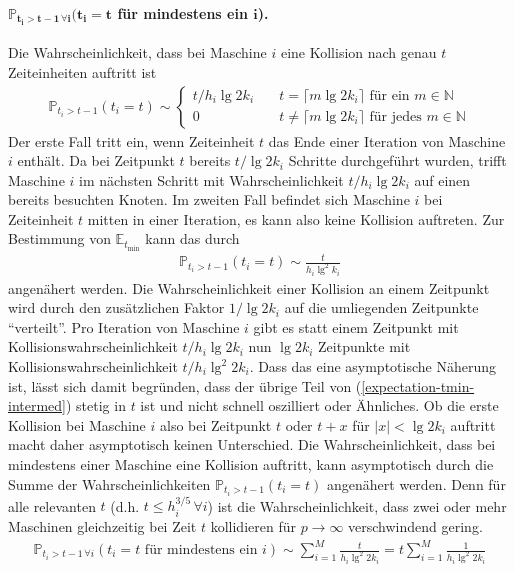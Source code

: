 \documentclass[a4paper, 10pt, ngerman]{article}
\newcommand{\E}{\mathbb{E}}
\newcommand{\N}{\mathbb{N}}
\renewcommand{\P}{\mathbb{P}}
\begin{document}
\paragraph{$\bm{\P_{t_i > t - 1 \, \forall i}(t_i = t}$  für mindestens ein $\bm{i}$).} Die Wahrscheinlichkeit, dass bei Maschine $i$ eine Kollision nach genau $t$ Zeiteinheiten auftritt ist
    \begin{align*}
        \P_{t_i > t - 1}(t_i = t) \sim
        \begin{cases}
            t / h_i \lg 2k_i & \quad
            t = \lceil m \lg 2k_i \rceil \text{ für ein } m \in \N \\
            0                & \quad
            t \ne \lceil m \lg 2k_i \rceil \text{ für jedes } m \in \N
        \end{cases}
    \end{align*}
    Der erste Fall tritt ein, wenn Zeiteinheit $t$ das Ende einer Iteration von Maschine $i$ enthält. Da bei Zeitpunkt $t$ bereits $t/\lg 2k_i$ Schritte durchgeführt wurden, trifft Maschine $i$ im nächsten Schritt mit Wahrscheinlichkeit $t/h_i \lg 2k_i$ auf einen bereits besuchten Knoten. Im zweiten Fall befindet sich Maschine $i$ bei Zeiteinheit $t$ mitten in einer Iteration, es kann also keine Kollision auftreten. Zur Bestimmung von $\E_{t_{\min}}$ kann das durch
    \begin{align*}
        \P_{t_i > t - 1}(t_i = t) \sim \frac {t} {h_i \lg^2 k_i}
    \end{align*}
    angenähert werden. Die Wahrscheinlichkeit einer Kollision an einem Zeitpunkt wird durch den zusätzlichen Faktor $1/\lg 2k_i$ auf die umliegenden Zeitpunkte "`verteilt"'. Pro Iteration von Maschine $i$ gibt es statt einem Zeitpunkt mit Kollisionswahrscheinlichkeit $t/h_i \lg 2k_i$ nun $\lg 2k_i$ Zeitpunkte mit Kollisionswahrscheinlichkeit $t/h_i \lg^2 2k_i$. Dass das eine asymptotische Näherung ist, lässt sich damit begründen, dass der übrige Teil von (\ref{expectation-tmin-intermed}) stetig in $t$ ist und nicht schnell oszilliert oder Ähnliches. Ob die erste Kollision bei Maschine $i$ also bei Zeitpunkt $t$ oder $t + x$ für $|x| < \lg 2k_i$ auftritt macht daher asymptotisch keinen Unterschied. Die Wahrscheinlichkeit, dass bei mindestens einer Maschine eine Kollision auftritt, kann asymptotisch durch die Summe der Wahrscheinlichkeiten $\P_{t_i > t - 1}(t_i = t)$ angenähert werden. Denn für alle relevanten $t$ (d.h. $t \le h_i^{3/5} \, \forall i$) ist die Wahrscheinlichkeit, dass zwei oder mehr Maschinen gleichzeitig bei Zeit $t$ kollidieren für $p \to \infty$ verschwindend gering.
    \begin{align}
        \P_{t_i > t - 1 \, \forall i}(t_i = t \text{ für mindestens ein } i)
        \sim \sum_{i = 1}^M \frac t {h_i \lg^2 2k_i}
        = t \sum_{i = 1}^M \frac 1 {h_i \lg^2 2k_i}
        \label{prob-at-least-one-coll}
    \end{align}
\end{document}
